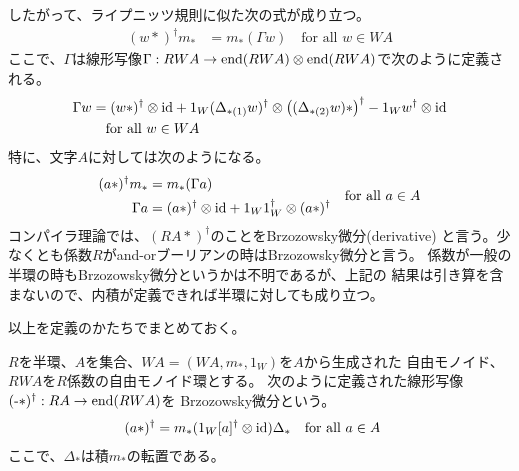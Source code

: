 		したがって、ライプニッツ規則に似た次の式が成り立つ。
		\begin{equation*}\begin{split} %
			(w*)^\dag m_* &= m_*(\Gamma w) \quad\text{for all }w\in WA
		\end{split}\end{equation*} %
		ここで、$\Gamma$は線形写像$\Gamma:RWA\to
		\operatorname{end}(RWA)\otimes \operatorname{end}(RWA)$で次のように定義される。
		\begin{equation*}\begin{split} %
			\Gamma w &= (w*)^\dag\otimes \myid
			+ 1_W(\Delta_{*(1)}w)^\dag\otimes \bigl((\Delta_{*(2)}w)*\bigr)^\dag
			- 1_Ww^\dag\otimes \myid \\
			&\quad\text{for all }w\in WA
		\end{split}\end{equation*} %
		特に、文字$A$に対しては次のようになる。
		\begin{equation*} %
			\begin{split}
				(a*)^\dag m_* &= m_*(\Gamma a) \\
				\Gamma a &= (a*)^\dag\otimes \myid + 1_W1_W^\dag\otimes (a*)^\dag
			\end{split} \quad\text{for all }a\in A
		\end{equation*} %
		コンパイラ理論では、$(RA*)^\dag$のことをBrzozowsky微分(derivative)
		と言う。少なくとも係数$R$がand-orブーリアンの時はBrzozowsky微分と言う。
		係数が一般の半環の時もBrzozowsky微分というかは不明であるが、上記の
		結果は引き算を含まないので、内積が定義できれば半環に対しても成り立つ。

		以上を定義のかたちでまとめておく。

		\begin{definition}[Brzozowsky微分]\label{def:Brzozowsky微分} %
			$R$を半環、$A$を集合、$WA=(WA,m_*,1_W)$を$A$から生成された
			自由モノイド、$RWA$を$R$係数の自由モノイド環とする。
			次のように定義された線形写像$(\myhere*)^\dag:RA\to \myop{end}(RWA)$を
			Brzozowsky微分という。
			\begin{equation*}\begin{split} %
				(a*)^\dag &= m_*(1_W[a]^\dag\otimes \myid)\Delta_*
				\quad\text{for all }a\in A
			\end{split}\end{equation*} %
			ここで、$\Delta_*$は積$m_*$の転置である。
		\end{definition} %

